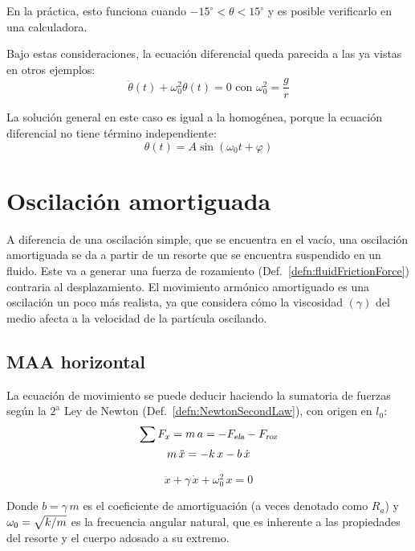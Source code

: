 En la práctica, esto funciona cuando $-15^{\circ}<\theta<15^{\circ}$ y es posible verificarlo en una calculadora.

Bajo estas consideraciones, la ecuación diferencial queda parecida a las ya vistas en otros ejemplos:
\[ \ddot{\theta} (t) + \omega_0^2 \theta (t) = 0 \text{ con } \omega_0^2 = \frac{g}{r}\]

La solución general en este caso es igual a la homogénea, porque la ecuación diferencial no tiene término independiente:
\[ \theta(t) = A \sin(\omega_0 t + \varphi) \]


\section{Oscilación amortiguada}
A diferencia de una oscilación simple, que se encuentra en el vacío, una oscilación amortiguada se da a partir de un resorte que se encuentra suspendido en un fluido.
Este va a generar una fuerza de rozamiento (Def.\ \ref{defn:fluidFrictionForce}) contraria al desplazamiento.
El movimiento armónico amortiguado es una oscilación un poco más realista, ya que considera cómo la viscosidad $(\gamma)$ del medio afecta a la velocidad de la partícula oscilando.


\subsection{MAA horizontal}

La ecuación de movimiento se puede deducir haciendo la sumatoria de fuerzas según la $2^{\text{a}}$ Ley de Newton (Def.\ \ref{defn:NewtonSecondLaw}), con origen en $l_0$:
\begin{gather*}
    \sum F_x = m \, a = - {{F}_\textsl{{ela}}} - {{F}_\textsl{{roz}}}
    \\
    m \, \ddot{x} = - k \, x - b \, \dot{x}
\end{gather*}

\begin{mdframed}[style=DefinitionFrame]
    \begin{defn}
    \end{defn}
    \begin{equation*}
        \ddot{x} + \gamma \, \dot{x} + \omega_0^2 \, x  = 0
    \end{equation*}
\end{mdframed}

Donde $b=\gamma \, m$ es el coeficiente de amortiguación (a veces denotado como $R_a$) y $\omega_0=\sqrt{k/m}$ es la frecuencia angular natural, que es inherente a las propiedades del resorte y el cuerpo adosado a su extremo.

